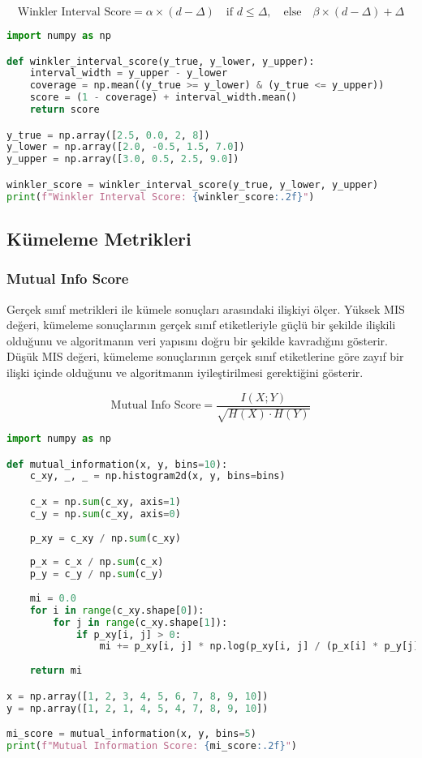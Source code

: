 \[\text{Winkler Interval Score} = \alpha \times (d - \Delta) \quad \text{if } d \leq \Delta, \quad \text{else} \quad \beta \times (d - \Delta) + \Delta\]

\begin{lstlisting}[language=Python]
import numpy as np

def winkler_interval_score(y_true, y_lower, y_upper):
    interval_width = y_upper - y_lower
    coverage = np.mean((y_true >= y_lower) & (y_true <= y_upper))
    score = (1 - coverage) + interval_width.mean()
    return score

y_true = np.array([2.5, 0.0, 2, 8])
y_lower = np.array([2.0, -0.5, 1.5, 7.0])
y_upper = np.array([3.0, 0.5, 2.5, 9.0])

winkler_score = winkler_interval_score(y_true, y_lower, y_upper)
print(f"Winkler Interval Score: {winkler_score:.2f}")
\end{lstlisting}

\newpage

\subsection{Kümeleme Metrikleri}

\subsubsection{Mutual Info Score}

Gerçek sınıf metrikleri ile kümele sonuçları arasındaki ilişkiyi ölçer. Yüksek MIS değeri, kümeleme sonuçlarının gerçek sınıf etiketleriyle güçlü bir şekilde ilişkili olduğunu ve algoritmanın veri yapısını doğru bir şekilde kavradığını gösterir. Düşük MIS değeri, kümeleme sonuçlarının gerçek sınıf etiketlerine göre zayıf bir ilişki içinde olduğunu ve algoritmanın iyileştirilmesi gerektiğini gösterir.

\[\text{Mutual Info Score} = \frac{I(X;Y)}{\sqrt{H(X) \cdot H(Y)}}\]

\begin{lstlisting}[language=Python]
import numpy as np

def mutual_information(x, y, bins=10):
    c_xy, _, _ = np.histogram2d(x, y, bins=bins)

    c_x = np.sum(c_xy, axis=1)
    c_y = np.sum(c_xy, axis=0)
    
    p_xy = c_xy / np.sum(c_xy)
    
    p_x = c_x / np.sum(c_x)
    p_y = c_y / np.sum(c_y)
    
    mi = 0.0
    for i in range(c_xy.shape[0]):
        for j in range(c_xy.shape[1]):
            if p_xy[i, j] > 0:
                mi += p_xy[i, j] * np.log(p_xy[i, j] / (p_x[i] * p_y[j]))
    
    return mi

x = np.array([1, 2, 3, 4, 5, 6, 7, 8, 9, 10])
y = np.array([1, 2, 1, 4, 5, 4, 7, 8, 9, 10])

mi_score = mutual_information(x, y, bins=5)
print(f"Mutual Information Score: {mi_score:.2f}")
\end{lstlisting}

